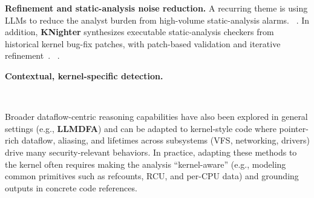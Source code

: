 \textbf{Refinement and static-analysis noise reduction.}
A recurring theme is using LLMs to reduce the analyst burden from high-volume static-analysis alarms.
~.
In addition, \textbf{KNighter} synthesizes executable static-analysis checkers from historical kernel bug-fix patches, with patch-based validation and iterative refinement~\cite{yang2025knighter}.
~.


\textbf{Contextual, kernel-specific detection.}

~

Broader dataflow-centric reasoning capabilities have also been explored in general settings (e.g., \textbf{LLMDFA}) and can be adapted to kernel-style code where pointer-rich dataflow, aliasing, and lifetimes across subsystems (VFS, networking, drivers) drive many security-relevant behaviors\cite{wang2024llmdfa}. 
In practice, adapting these methods to the kernel often requires making the analysis ``kernel-aware'' (e.g., modeling common primitives such as refcounts, RCU, and per-CPU data) and grounding outputs in concrete code references.


